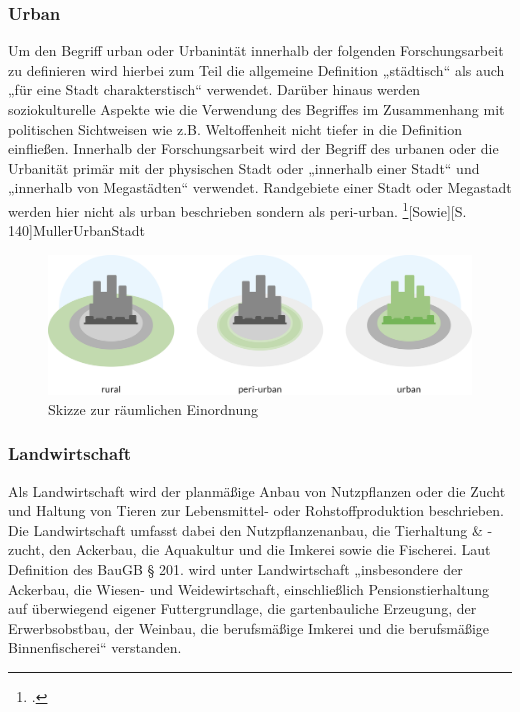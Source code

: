 \documentclass{scrartcl}
\begin{document}
\subsubsection{Urban}
Um den Begriff urban oder Urbanintät innerhalb der folgenden Forschungsarbeit zu definieren wird hierbei zum Teil die allgemeine Definition „städtisch“ als auch „für eine Stadt charakterstisch“ verwendet. Darüber hinaus werden soziokulturelle Aspekte wie die Verwendung des Begriffes im Zusammenhang mit politischen Sichtweisen wie z.B. Weltoffenheit nicht tiefer in die Definition einfließen. Innerhalb der Forschungsarbeit wird der Begriff des urbanen oder die Urbanität primär mit der physischen Stadt oder „innerhalb einer Stadt“ und „innerhalb von Megastädten“ verwendet. Randgebiete einer Stadt oder Megastadt werden hier nicht als urban beschrieben sondern als peri-urban. \footcite[Vgl.]{Duden, allgemeingültige Definition, urban}[Sowie][S. 140]{MullerUrbanStadt}

\begin{figure}[h]
\centering
\includegraphics[width=12cm]{image_folder/SchaubildUrbaneEingrenzungen.png}
\caption{Skizze zur räumlichen Einordnung\footnotemark}
\label{fig:ul_typologie}
\end{figure}

\subsubsection{Landwirtschaft}
Als Landwirtschaft wird der planmäßige Anbau von Nutzpflanzen oder die Zucht und Haltung von Tieren zur Lebensmittel- oder Rohstoffproduktion beschrieben.			Die Landwirtschaft umfasst dabei den Nutzpflanzenanbau, die Tierhaltung & -zucht, den Ackerbau, die Aquakultur und die Imkerei sowie die Fischerei. Laut Definition des BauGB § 201. wird unter Landwirtschaft „insbesondere der Ackerbau, die Wiesen- und Weidewirtschaft, einschließlich Pensionstierhaltung auf überwiegend eigener Futtergrundlage, die gartenbauliche Erzeugung, der Erwerbsobstbau, der Weinbau, die berufsmäßige Imkerei und die berufsmäßige Binnenfischerei“ verstanden.
\end{document}

